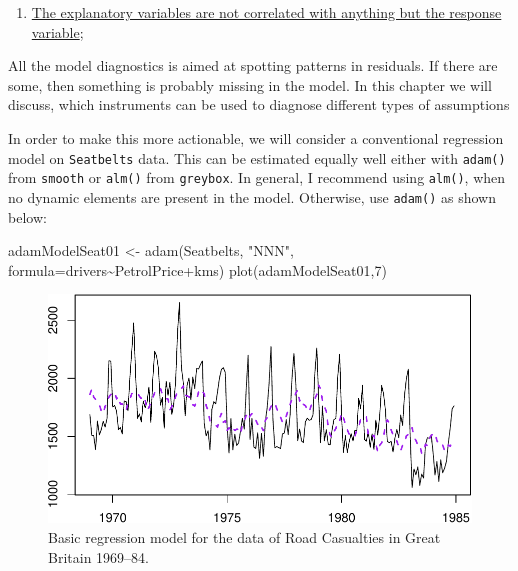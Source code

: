 \documentclass[
]{book}
\newenvironment{Shaded}{\begin{snugshade}}{\end{snugshade}}
\newcommand{\AttributeTok}[1]{\textcolor[rgb]{0.77,0.63,0.00}{#1}}
\newcommand{\DecValTok}[1]{\textcolor[rgb]{0.00,0.00,0.81}{#1}}
\newcommand{\FunctionTok}[1]{\textcolor[rgb]{0.00,0.00,0.00}{#1}}
\newcommand{\NormalTok}[1]{#1}
\newcommand{\OtherTok}[1]{\textcolor[rgb]{0.56,0.35,0.01}{#1}}
\newcommand{\SpecialCharTok}[1]{\textcolor[rgb]{0.00,0.00,0.00}{#1}}
\newcommand{\StringTok}[1]{\textcolor[rgb]{0.31,0.60,0.02}{#1}}
\providecommand{\tightlist}{%
  \setlength{\itemsep}{0pt}\setlength{\parskip}{0pt}}
\theoremstyle{definition}
\theoremstyle{definition}
\theoremstyle{definition}
\theoremstyle{definition}
\theoremstyle{remark}
\begin{document}
\begin{enumerate}
\def\labelenumi{\arabic{enumi}.}
\setcounter{enumi}{2}
\tightlist
\item
  \protect\hyperlink{diagnosticsMulticollinearity}{The explanatory variables are not correlated with anything but the response variable};
\end{enumerate}

All the model diagnostics is aimed at spotting patterns in residuals. If there are some, then something is probably missing in the model. In this chapter we will discuss, which instruments can be used to diagnose different types of assumptions

In order to make this more actionable, we will consider a conventional regression model on \texttt{Seatbelts} data. This can be estimated equally well either with \texttt{adam()} from \texttt{smooth} or \texttt{alm()} from \texttt{greybox}. In general, I recommend using \texttt{alm()}, when no dynamic elements are present in the model. Otherwise, use \texttt{adam()} as shown below:

\begin{Shaded}
\begin{Highlighting}[]
\NormalTok{adamModelSeat01 }\OtherTok{\textless{}{-}} \FunctionTok{adam}\NormalTok{(Seatbelts, }\StringTok{"NNN"}\NormalTok{,}
                        \AttributeTok{formula=}\NormalTok{drivers}\SpecialCharTok{\textasciitilde{}}\NormalTok{PetrolPrice}\SpecialCharTok{+}\NormalTok{kms)}
\FunctionTok{plot}\NormalTok{(adamModelSeat01,}\DecValTok{7}\NormalTok{)}
\end{Highlighting}
\end{Shaded}

\begin{figure}
\centering
\includegraphics{adam_files/figure-latex/adamModelSeat01-1.pdf}
\caption{\label{fig:adamModelSeat01}Basic regression model for the data of Road Casualties in Great Britain 1969--84.}
\end{figure}
\end{document}
